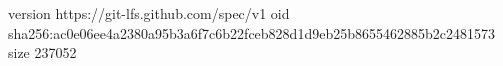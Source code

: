 version https://git-lfs.github.com/spec/v1
oid sha256:ac0e06ee4a2380a95b3a6f7c6b22fceb828d1d9eb25b8655462885b2c2481573
size 237052
